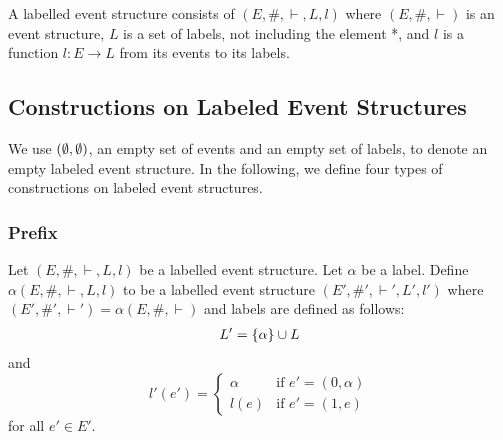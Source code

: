 \begin{definition}
    A labelled event structure consists of $(E,\#,\vdash,L,l)$ where
    $(E,\#,\vdash)$ is an event structure, $L$ is a set of labels,
    not including the element *, and $l$ is a function $l: E \rightarrow L$
    from its events to its labels.
\end{definition}
\subsection{Constructions on Labeled Event Structures \cite{es}}
We use $(\emptyset,\emptyset)$, an empty set of events and an empty set of labels, to
denote an empty labeled event structure.
In the following, we define four types of constructions on labeled
event structures.

\subsubsection{Prefix}
\begin{definition}[Prefix]
    Let $(E,\#,\vdash,L,l)$ be a labelled event structure.
    Let $\alpha$ be a label.
    Define $\alpha(E,\#,\vdash,L,l)$ to be a labelled event structure
    $(E',\#',\vdash',L',l')$ where $(E',\#',\vdash') = \alpha(E,\#,\vdash)$
    and labels are defined as follows:
    \begin{align*}
        L' = \{\alpha\} \cup L
    \end{align*}
    and
    $$
        l'(e') = \begin{cases}
            \alpha & \text{if } e' = (0,\alpha) \\
            l(e)   & \text{if } e' = (1,e)
        \end{cases}
    $$
    for all $e' \in E'$.
\end{definition}

